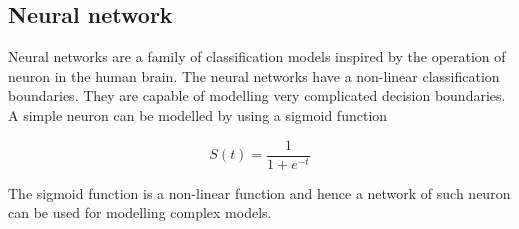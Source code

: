 \documentclass{article} %
\begin{document}
    
\subsection{Neural network}
\label{sub:neural}

Neural networks are a family of classification models inspired by the operation of neuron in the human brain. The neural networks have a non-linear classification boundaries. They are capable of modelling very complicated decision boundaries. A simple neuron can be modelled by using a sigmoid function

\begin{equation}
S(t) = \frac{1}{1+ e^{-t}}
\label{eqn:sigmoid}
\end{equation}

The sigmoid function is a non-linear function and hence a network of such neuron can be used for modelling complex models.
\end{document}
